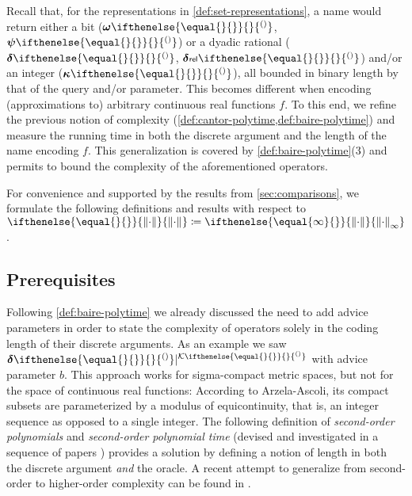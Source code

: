 \documentclass{CSML}
\let\originalleft\left
\let\originalright\right
\renewcommand{\left}{\mathopen{}\mathclose\bgroup\originalleft}
\renewcommand{\right}{\aftergroup\egroup\originalright}
\newcommand{\representation}[2]{ #1\ifnotempty{#2}{^{(#2)}} }
\newcommand{\IR}{\mathbb{R}}
\newcommand{\realrep}[1][\empty]{ \bm{\rho}\ifnotempty{#1}{^{#1}} }
\newcommand{\dyfunrep}[2]{ [\realrep[#1] \!\to\! \realrep[#2]] }
\newcommand{\distrep}[1][\empty]{ \representation{\bm{\delta}}{#1} }
\newcommand{\reldistrep}[1][\empty]{ \representation{%
	\bm{\delta}\kern.05ex{\scriptstyle\mathsf{rel}}\kern.1ex%
	}{#1} }
\newcommand{\setrep}[1][\empty]{ \representation{\bm{\psi}}{#1} }
\newcommand{\gridrep}[1][\empty]{ \representation{\bm{\kappa}}{#1} }
\newcommand{\wmemrep}[1][\empty]{ \representation{\bm{\omega}}{#1} }
\newcommand{\norm}[2][\empty]{
   \ifthenelse{\equal{#1}{\empty}}{%
      \left\|#2\right\|
   }{%
      \left\|#2\right\|_{#1}
   }
}
\newcommand{\normdot}[1][\empty]{\norm[#1]{\cdot}}
\newcommand{\compset}[1][\empty]{ \representation{\mathcal{K}}{#1} }
\newcommand{\ifnotempty}[2]{ \ifthenelse{ \equal{#1}{\empty} }{}{#2} }
\newcommand{\dfeq}{\coloneqq}
\newcommand{\cfn}{\mathrm{C}}
\begin{document}
Recall that, for the representations in \cref{def:set-representations},
a name would return either a bit ($\wmemrep$, $\setrep$) or a dyadic rational
($\distrep$, $\reldistrep$) and/or an integer ($\gridrep$), all bounded in binary
length by that of the query and/or parameter.
This becomes different when encoding (approximations to) arbitrary continuous
real functions $f$.
To this end, we refine the previous notion of complexity
(\cref{def:cantor-polytime,def:baire-polytime}) and measure the running time in
both the discrete argument and the length of the name encoding $f$.
This generalization is covered by \cref{def:baire-polytime}(3) and permits
to bound the complexity of the aforementioned operators.

For convenience and supported by the results from \cref{sec:comparisons}, we
formulate the following definitions and results with respect to
$\normdot \dfeq \normdot[\infty]$.


\subsection{Prerequisites}


Following \cref{def:baire-polytime} we already discussed the need to add
advice parameters in order to state the complexity of operators solely in
the coding length of their discrete arguments.
As an example we saw $\distrep|^{\compset}$ with advice parameter $b$.
This approach works for sigma-compact metric spaces, but not for the space of
continuous real functions:
According to Arzela-Ascoli, its compact subsets are parameterized by a modulus
of equicontinuity, that is, an integer sequence as opposed to a single integer.
The following definition of \emph{second-order polynomials} and
\emph{second-order polynomial time} (devised and investigated in a sequence
of papers \cite{Mehlhorn76,KapronCook96,Lambov06,KawamuraCook}) provides a solution by defining a
notion of length in both the discrete argument \emph{and} the oracle.
A recent attempt to generalize from second-order to higher-order complexity
can be found in \cite{FH13}.
\end{document}
